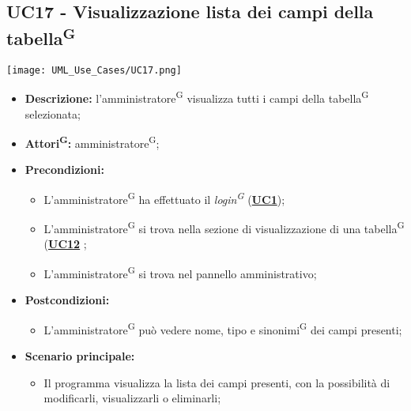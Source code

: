 \subsection{UC17 - Visualizzazione lista dei campi della tabella\textsuperscript{G}}
\label{sec:UC17}
\texttt{[image: UML\_Use\_Cases/UC17.png]}
\begin{itemize}
	\item \textbf{Descrizione:} l’amministratore\textsuperscript{G} visualizza tutti i campi della tabella\textsuperscript{G} selezionata;
	\item \textbf{Attori\textsuperscript{G}:} amministratore\textsuperscript{G};
	\item \textbf{Precondizioni:} 
	\begin{itemize}
		\item L’amministratore\textsuperscript{G} ha effettuato il \textit{login\textsuperscript{G}} (\hyperref[sec:UC1]{\textbf{UC1}});
		\item L’amministratore\textsuperscript{G} si trova nella sezione di visualizzazione di una tabella\textsuperscript{G} (\hyperref[sec:UC12]{\textbf{UC12}} ;
		\item L’amministratore\textsuperscript{G} si trova nel pannello amministrativo;
	\end{itemize}
	\item \textbf{Postcondizioni:} 
	\begin{itemize}
		\item L'amministratore\textsuperscript{G} può vedere nome, tipo e sinonimi\textsuperscript{G} dei campi presenti;
	\end{itemize}
	\item \textbf{Scenario principale:} 
	\begin{itemize}
		\item Il programma visualizza la lista dei campi presenti, con la possibilità di modificarli, visualizzarli o eliminarli;
	\end{itemize}
\end{itemize}


